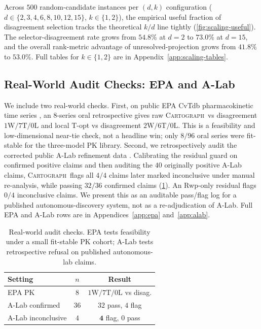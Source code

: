 \documentclass{article}
\newcommand{\method}{\textsc{Cartograph}}
\theoremstyle{plain}
\theoremstyle{definition}
\theoremstyle{remark}
\begin{document}
Across $500$ random-candidate instances per $(d,k)$ configuration
($d\in\{2,3,4,6,8,10,12,15\}$, $k\in\{1,2\}$), the empirical useful
fraction of disagreement selection tracks the theoretical $k/d$ line tightly
(\cref{fig:scaling-useful}). The selector-disagreement rate grows from
$54.8\%$ at $d\!=\!2$ to $73.0\%$ at $d\!=\!15$, and the overall
rank-metric advantage of unresolved-projection grows from $41.8\%$ to
$53.0\%$. Full tables for $k\!\in\!\{1,2\}$ are in
Appendix~\ref{app:scaling-tables}.

\subsection{Real-World Audit Checks: EPA and A-Lab}
\label{sec:epa}

We include two real-world checks. First, on public EPA CvTdb
pharmacokinetic time series \citep{sayre2020cvtdb}, an $8$-series oral
retrospective gives raw \method\ vs disagreement
$1\mathrm{W}/7\mathrm{T}/0\mathrm{L}$ and local T-opt vs disagreement
$2\mathrm{W}/6\mathrm{T}/0\mathrm{L}$. This is a feasibility and
low-dimensional near-tie check, not a headline win; only $8/96$ oral series
were fit-stable for the three-model PK library. Second, we retrospectively
audit the corrected public A-Lab refinement data
\citep{szymanski2023alab,szymanski2026correction}. Calibrating the residual
guard on confirmed positive claims and then auditing the $40$ originally
positive A-Lab claims, \method\ flags all $4/4$ claims later marked
inconclusive under manual re-analysis, while passing $32/36$ confirmed
claims (\cref{tab:real-audit}). An Rwp-only residual flags $0/4$
inconclusive claims. We present this as an auditable pass/flag log for a
published autonomous-discovery system, not as a re-adjudication of A-Lab.
Full EPA and A-Lab rows are in Appendices~\ref{app:epa} and~\ref{app:alab}.

\begin{table}[t]
\caption{Real-world audit checks. EPA tests feasibility under a small
fit-stable PK cohort; A-Lab tests retrospective refusal on published
autonomous-lab claims.}
\label{tab:real-audit}
\centering
\small
\begin{tabular}{l c c}
\toprule
Setting & $n$ & Result \\
\midrule
EPA PK & $8$ & $1\mathrm{W}/7\mathrm{T}/0\mathrm{L}$ vs disag. \\
A-Lab confirmed & $36$ & $32$ pass, $4$ flag \\
A-Lab inconclusive & $4$ & $\mathbf{4}$ flag, $0$ pass \\
\bottomrule
\end{tabular}
\end{table}
\end{document}
